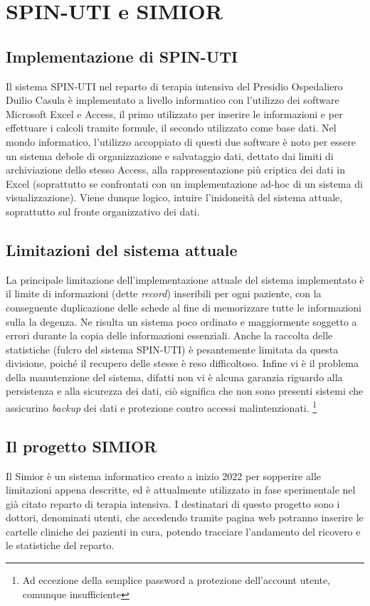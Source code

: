 \chapter{SPIN-UTI e SIMIOR}
\section{Implementazione di SPIN-UTI}
Il sistema SPIN-UTI nel reparto di terapia intensiva del Presidio Ospedaliero Duilio Casula è implementato a livello informatico con l'utilizzo dei software Microsoft Excel e Access, il primo utilizzato per inserire le informazioni e per effettuare i calcoli tramite formule, il secondo utilizzato come base dati.
Nel mondo informatico, l'utilizzo accoppiato di questi due software è noto per essere un sistema debole di organizzazione e salvataggio dati, dettato dai limiti di archiviazione dello stesso Access, alla rappresentazione più criptica dei dati in Excel (soprattutto se confrontati con un implementazione ad-hoc di un sistema di visualizzazione).
Viene dunque logico, intuire l'inidoneità del sistema attuale, soprattutto sul fronte organizzativo dei dati.
\section{Limitazioni del sistema attuale}
La principale limitazione dell'implementazione attuale del sistema implementato è il limite di informazioni (dette \textit{record}) inseribili per ogni paziente, con la conseguente duplicazione delle schede al fine di memorizzare tutte le informazioni sulla la degenza. 
Ne risulta un sistema poco ordinato e maggiormente soggetto a errori durante la copia delle informazioni essenziali.
Anche la raccolta delle statistiche (fulcro del sistema SPIN-UTI) è pesantemente limitata da questa divisione, poiché il recupero delle stesse è reso difficoltoso.
Infine vi è il problema della manutenzione del sistema, difatti non vi è alcuna garanzia riguardo alla persistenza e alla sicurezza dei dati, ciò significa che non sono presenti sistemi che assicurino \textit{backup} dei dati e protezione contro accessi malintenzionati. \footnote{Ad eccezione della semplice password a protezione dell'account utente, comunque insufficiente}
\section{Il progetto SIMIOR}
Il Simior è un sistema informatico creato a inizio 2022 per sopperire alle limitazioni appena descritte, ed è attualmente utilizzato in fase sperimentale nel già citato reparto di terapia intensiva.
I destinatari di questo progetto sono i dottori, denominati utenti, che accedendo tramite pagina web potranno inserire le cartelle cliniche dei pazienti in cura, potendo tracciare l'andamento del ricovero e le statistiche del reparto.
